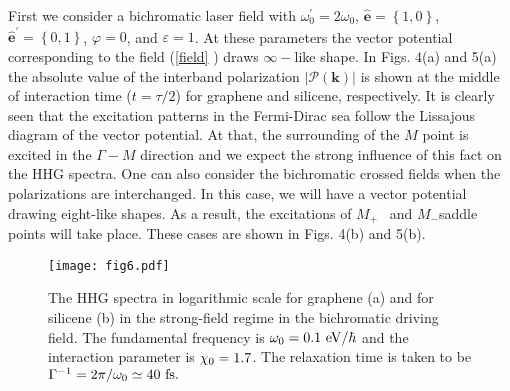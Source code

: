 \documentclass[reprint, superscriptaddress,  aps, pra]{revtex4-2}
\begin{document}
First we consider a bichromatic laser field with $\omega _{0}^{\prime
}=2\omega _{0}$, $\hat{\mathbf{e}}=\left\{ 1,0\right\} $, $\hat{\mathbf{e}}%
^{\prime }=\left\{ 0,1\right\} $, $\varphi =0$, and $\varepsilon =1$. At
these parameters the vector potential corresponding to the field (\ref{field}%
) draws $\infty -$like shape. In Figs. 4(a) and 5(a) the absolute value of
the interband polarization $\left\vert \mathcal{P}(\mathbf{k})\right\vert $
is shown at the middle of interaction time ($t=\tau /2$) for graphene and
silicene, respectively. It is clearly seen that the excitation patterns in
the Fermi-Dirac sea follow the Lissajous diagram of the vector potential. At
that, the surrounding of the $M$ point is excited in the $\Gamma -M$
direction and we expect the strong influence of this fact on the HHG
spectra. One can also consider the bichromatic crossed fields when the
polarizations are interchanged. In this case, we will have a vector
potential drawing eight-like shapes. As a result, the excitations of $M_{+}$%
\ and $M_{-}$saddle points will take place. These cases are shown in Figs.
4(b) and 5(b). 
\begin{figure}[tbp]
\texttt{[image: fig6.pdf]}
\caption{The HHG spectra in logarithmic scale for graphene (a) and for
silicene (b) in the strong-field regime in the bichromatic driving field.
The fundamental frequency is $\protect\omega _{0}=0.1\ \mathrm{eV}/\hbar $
and the interaction parameter is $\protect\chi _{0}=1.7$. The relaxation
time is taken to be $\Gamma ^{-1}=2\protect\pi /\protect\omega _{0}\simeq
40\ \mathrm{fs.}$}
\end{figure}
\end{document}
